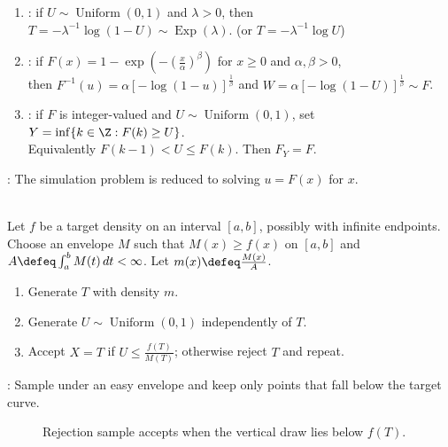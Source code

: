 \begin{method} \label{meth:inverse-transform-simulation-examples} 
\begin{enumerate}[label=(\roman*)]
\setlength{\itemsep}{0pt}
\item {}: if $U\sim\operatorname{Uniform}(0,1)$ and $\lambda>0$, then $T=-\lambda^{-1}\log(1-U)\sim\operatorname{Exp}(\lambda)$. (or $T=-\lambda^{-1}\log U$)
\item {}: if $F(x)=1-\exp(-(\frac{x}{\alpha})^\beta)$ for $x\geq0$ and $\alpha,\beta>0$,\\
then $F^{-1}(u)=\alpha[-\log(1-u)]^{\frac{1}{\beta}}$ and $W=\alpha[-\log(1-U)]^{\frac{1}{\beta}}\sim F$.
\item {}: if $F$ is integer-valued and $U\sim\operatorname{Uniform}(0,1)$, set $Y=\inf\{k\in\Z:F(k)\geq U\}$.\\
Equivalently $F(k-1)<U\leq F(k)$. Then $F_Y=F$.
\end{enumerate}
: The simulation problem is reduced to solving $u=F(x)$ for $x$.
\end{method}

\begin{method} \label{method:rejection-sampling} \\
Let $f$ be a target density on an interval $[a,b]$, possibly with infinite endpoints.\\
Choose an envelope $M$ such that $M(x)\geq f(x)$ on $[a,b]$ and $A\defeq\int_a^b M(t)\,dt<\infty$. Let $m(x)\defeq \frac{M(x)}{A}$.
\begin{enumerate}[label=(\roman*)]
\setlength{\itemsep}{0pt}
\item Generate $T$ with density $m$.
\item Generate $U\sim\operatorname{Uniform}(0,1)$ independently of $T$.
\item Accept $X=T$ if $U\leq \frac{f(T)}{M(T)}$; otherwise reject $T$ and repeat.
\end{enumerate}
: Sample under an easy envelope and keep only points that fall below the target curve.
\end{method}

\begin{figure}[H]
  \centering
  
  \caption{Rejection sample accepts when the vertical draw lies below $f(T)$.}
  \label{fig:rejection-sampling-envelope}
\end{figure}

